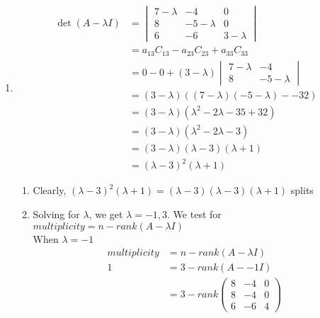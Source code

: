 \documentclass[13pt]{article}
\begin{document}
\begin{enumerate}[label=(\alph*),leftmargin=*]
\item
  \begin{align*}
    \det(A - \lambda I) &=
                          \begin{vmatrix}
                            7 - \lambda & -4 & 0 \\
                            8 & -5 - \lambda & 0 \\
                            6 & -6 & 3 - \lambda
                          \end{vmatrix} \\
                        &= a_{13}C_{13} - a_{23}C_{23} + a_{33}C_{33} \\
                        &= 0 - 0 + (3 - \lambda)
                          \begin{vmatrix}
                            7 - \lambda & -4 \\
                            8 & -5 - \lambda
                          \end{vmatrix} \\
                        &= (3 - \lambda)((7 - \lambda)(-5 - \lambda) - -32) \\
                        &= (3 - \lambda)(\lambda^2 - 2\lambda - 35 + 32) \\
                        &= (3 - \lambda)(\lambda^2 - 2\lambda - 3) \\
                        &= (3 - \lambda)(\lambda - 3)(\lambda + 1) \\
                        &= (\lambda - 3)^2(\lambda + 1)
  \end{align*}
  \begin{enumerate}
  \item Clearly, $(\lambda - 3)^2(\lambda + 1) = (\lambda - 3)(\lambda - 3)(\lambda + 1)$ splits
  \item Solving for $\lambda$, we get $\lambda = -1, 3$. We test for $multiplicity = n - rank(A - \lambda I)$ \\
    When $\lambda = -1$
    \begin{align*}
      multiplicity &= n - rank(A - \lambda I) \\
      1 &= 3 - rank(A - -1I) \\
                   &= 3 - rank
                     \begin{pmatrix}
                       8 & -4 & 0 \\
                       8 & -4 & 0 \\
                       6 & -6 & 4
                     \end{pmatrix} \\

\end{align*}
\end{enumerate}
\end{enumerate}
\end{document}
